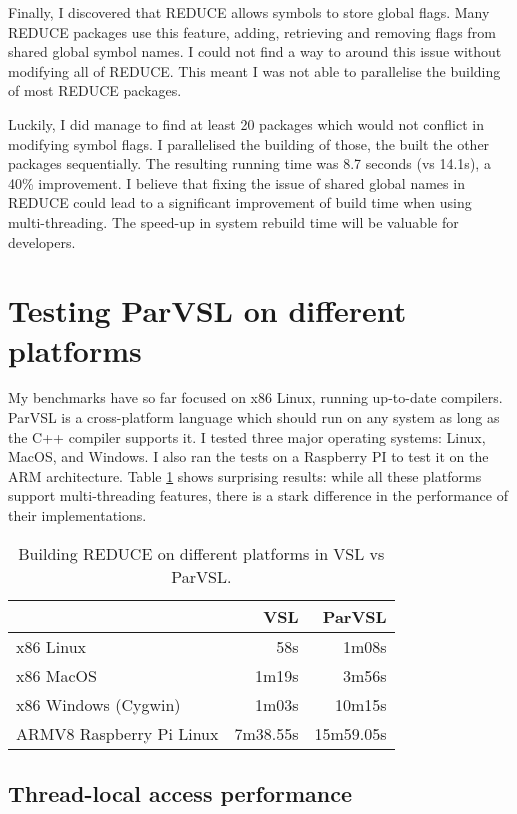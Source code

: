 Finally, I discovered that REDUCE allows symbols to store global flags.
Many REDUCE packages use this feature, adding, retrieving and removing flags from shared
global symbol names. I could not find a way to around this issue without modifying all of REDUCE.
This meant I was not able to parallelise the building of most REDUCE packages.

Luckily, I did manage to find at least 20 packages which would not conflict in modifying symbol flags.
I parallelised the building of those, the built the other packages sequentially. The resulting
running time was 8.7 seconds (vs 14.1s), a 40\% improvement.
I believe that fixing the issue of shared global names in REDUCE could lead to a significant improvement
of build time when using multi-threading. The speed-up in system rebuild time will be valuable for
developers.

\section{Testing ParVSL on different platforms}
\label{sec:crossplatform}

My benchmarks have so far focused on x86 Linux, running
up-to-date compilers. ParVSL is a cross-platform language which should run on
any system as long as the C++ compiler supports it.
I tested three major operating systems: Linux, MacOS, and Windows. I also
ran the tests on a Raspberry PI to test it on the ARM architecture.
Table \ref{table:cross-platform-reduce} shows surprising results:
while all these platforms support multi-threading features,
there is a stark difference in the performance of their implementations.

\begin{table}[H]
  \centering
  \begin{tabular}{lrr}
                       & VSL    & ParVSL \\
  \hline
  x86 Linux            &   58s &  1m08s \\
  x86 MacOS            & 1m19s &  3m56s \\
  x86 Windows (Cygwin) & 1m03s & 10m15s \\
  ARMV8 Raspberry Pi Linux & 7m38.55s & 15m59.05s
  \end{tabular}
  \caption{Building REDUCE on different platforms in VSL vs ParVSL.}
  \label{table:cross-platform-reduce}
\end{table}

\subsection{Thread-local access performance}

